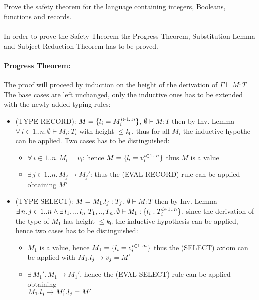 \subsection{}

Prove the safety theorem for the language containing integers,
Booleans, functions and records.\\~\\ In order to prove the Safety
Theorem the Progress Theorem, Substitution Lemma and Subject Reduction
Theorem has to be proved.

\paragraph*{Progress Theorem:\\}
The proof will proceed by induction on the height of the derivation of
\(\Gamma \vdash M: T\) The base cases are left unchanged, only the
inductive ones has to be extended with the newly added typing rules:

\begin{itemize}
\item (TYPE RECORD): \(M= \{l_i=M_i^{i \in 1..n}\}\), \(\emptyset
  \vdash M: T\) then by Inv. Lemma \(\forall\, i \in 1..n.\, \emptyset
  \vdash M_i: T_i\) with height \(\le k_0\), thus for all \(M_i\) the
  inductive hypothe can be applied. Two cases has to be distinguished:
  \begin{itemize}
  \item \(\forall\, i \in 1..n.\, M_i = v_i\): hence \(M =
    \{l_i=v_i^{i \in 1..n}\}\) thus \(M\) is a value
  \item \(\exists\, j \in 1..n.\, M_j \to M_j'\): thus the (EVAL
    RECORD) rule can be applied obtaining \(M'\)
  \end{itemize}
\item (TYPE SELECT): \(M = M_1.l_j: T_j\), \(\emptyset \vdash
  M: T\) then by Inv. Lemma\\ \(\exists\, n.\, j \in 1..n \wedge
  \exists\, l_1,..,l_n\ T_1,..,T_n.\, \emptyset \vdash M_1 :
  \{l_i: T_i^{i \in 1..n}\}\), since the derivation of the type of
  \(M_1\) has height \(\le k_0\) the inductive hypothesis can be
  applied, hence two cases has to be distinguished:
  \begin{itemize}
  \item \(M_1\) is a value, hence \(M_1 = \{l_i = v_i^{i \in
      1..n}\}\) thus the (SELECT) axiom can be applied with
    \(M_1.l_j \to v_j = M'\)
  \item \(\exists\, M_1'.\, M_1 \to M_1'\), hence the (EVAL SELECT)
    rule can be applied obtaining\\ \(M_1.l_j \to
    M_1'.l_j = M'\)
  \end{itemize}
\end{itemize}

